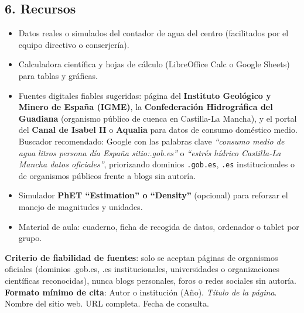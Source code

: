 \documentclass[11pt,a4paper]{article}
\begin{document}
\subsection*{6. Recursos}
\begin{itemize}
    \item Datos reales o simulados del contador de agua del centro (facilitados por el equipo directivo o conserjería).
    \item Calculadora científica y hojas de cálculo (LibreOffice Calc o Google Sheets) para tablas y gráficas.
    \item Fuentes digitales fiables sugeridas: página del \textbf{Instituto Geológico y Minero de España (IGME)}, la \textbf{Confederación Hidrográfica del Guadiana} (organismo público de cuenca en Castilla-La Mancha), y el portal del \textbf{Canal de Isabel II} o \textbf{Aqualia} para datos de consumo doméstico medio. Buscador recomendado: Google con las palabras clave \textit{``consumo medio de agua litros persona día España sitio:.gob.es''} o \textit{``estrés hídrico Castilla-La Mancha datos oficiales''}, priorizando dominios \texttt{.gob.es}, \texttt{.es} institucionales o de organismos públicos frente a blogs sin autoría.
    \item Simulador \textbf{PhET ``Estimation'' o ``Density''} (opcional) para reforzar el manejo de magnitudes y unidades.
    \item Material de aula: cuaderno, ficha de recogida de datos, ordenador o tablet por grupo.
\end{itemize}
\textbf{Criterio de fiabilidad de fuentes}: solo se aceptan páginas de organismos oficiales (dominios .gob.es, .es institucionales, universidades o organizaciones científicas reconocidas), nunca blogs personales, foros o redes sociales sin autoría. \textbf{Formato mínimo de cita}: Autor o institución (Año). \textit{Título de la página}. Nombre del sitio web. URL completa. Fecha de consulta.
\end{document}
